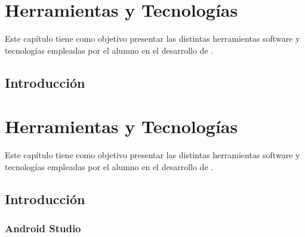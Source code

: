 %
%
%


\cleardoublepage
\chapter{Herramientas y Tecnologías} \label{chap:Tecnologias} 

Este capítulo tiene como objetivo presentar las distintas herramientas software y tecnologías empleadas por el alumno en el desarrollo de \ULLNavigation{}.

\section{Introducción}
%
%
%


\cleardoublepage
\chapter{Herramientas y Tecnologías} \label{chap:Tecnologias} 

Este capítulo tiene como objetivo presentar las distintas herramientas software y tecnologías empleadas por el alumno en el desarrollo de \ULLNavigation{}.

\section{Introducción}

\subsection{Android Studio}

